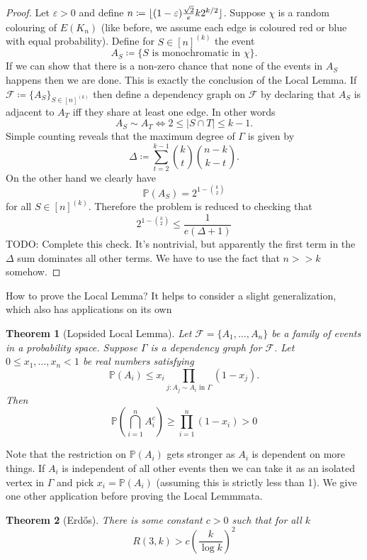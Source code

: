 \documentclass{report}
\DeclarePairedDelimiter\floor{\lfloor}{\rfloor}
\theoremstyle{definition}
\theoremstyle{plain}
\newtheorem{thm}{Theorem}
\theoremstyle{definition}
\begin{document}
	\begin{proof}
		Let $\varepsilon >0$ and define $n\coloneqq \floor{(1-\varepsilon) \frac{\sqrt{2}}{e} k 2^{k/2}}$. Suppose $\chi$ is a random colouring of $E(K_n)$ (like before, we assume each edge is coloured red or blue with equal probability). Define for $S\in [n]^{(k)}$ the event
		\[
			A_S \coloneqq \{S \text{ is monochromatic in }\chi\}.
		\]
		If we can show that there is a non-zero chance that none of the events in $A_S$ happens then we are done.  This is exactly the conclusion of the Local Lemma. If $\mathcal{F}\coloneqq \{A_S\}_{S\in[n]^{(k)}}$ then define a dependency graph on $\mathcal{F}$ by declaring that $A_S$ is adjacent to $A_T$ iff they share at least one edge. In other words
		\[
			A_S \sim A_T \iff 2 \leq |S\cap T| \leq  k-1.
		\]
		Simple counting reveals that the maximum degree of $\Gamma$ is given by
		\[
			\Delta\coloneqq \sum_{t = 2}^{k-1} \binom{k}{t}\binom{n-k}{k-t}.
		\]	
		On the other hand we clearly have 
		\[
			\mathbb{P}(A_S) = 2^{1 - \binom{k}{2}}
		\]
		for all $S\in [n]^{(k)}$. Therefore the problem is reduced to checking that
		\[
			2^{1 - \binom{k}{2}} \leq \frac{1}{e(\Delta + 1)}
		\] 
		{\color{red}TODO: Complete this check. It's nontrivial, but apparently the first term in the $\Delta$ sum dominates all other terms. We have to use the fact that $n>> k$ somehow.}
		 
	\end{proof}
	How to prove the Local Lemma? It helps to consider a slight generalization, which also has applications on its own
	\begin{thm}[Lopsided Local Lemma]
		Let $\mathcal{F} = \{A_1,\ldots, A_n\}$ be a family of events in a probability space. Suppose $\Gamma$ is a dependency graph for $\mathcal{F}$. Let $0\leq x_1,\ldots,x_n < 1$ be real numbers satisfying
		\[
			\mathbb{P}(A_i) \leq x_i \prod_{j\colon A_j \sim A_i \text{ in }\Gamma}(1-x_j).
		\]
		Then 
		\[
			\mathbb{P}\left(\bigcap_{i=1}^n A_i^c\right) \geq \prod_{i = 1}^{n}(1-x_i) > 0
		\]	
	\end{thm}
	Note that the restriction on $\mathbb{P}(A_i)$ gets stronger as $A_i$ is dependent on more things. If $A_i$ is independent of all other events then we can take it as an isolated vertex in $\Gamma$ and pick $x_i = \mathbb{P}(A_i)$ (assuming this is strictly less than 1). We give one other application before proving the Local Lemmmata.
	\begin{thm}[Erd\H{o}s]
		There is some constant $c>0$ such that for all $k$
		\[
			R(3,k) > c\left(\frac{k}{\log k}\right)^2
		\]
	\end{thm}
\end{document}
